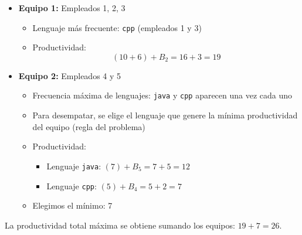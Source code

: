 \begin{itemize}
    \item \textbf{Equipo 1:} Empleados 1, 2, 3  
        \begin{itemize}
            \item Lenguaje más frecuente: \texttt{cpp} (empleados 1 y 3)  
            \item Productividad: 
            \[
            (10 + 6) + B_2 = 16 + 3 = 19
            \]
        \end{itemize}
    \item \textbf{Equipo 2:} Empleados 4 y 5  
        \begin{itemize}
            \item Frecuencia máxima de lenguajes: \texttt{java} y \texttt{cpp} aparecen una vez cada uno  
            \item Para desempatar, se elige el lenguaje que genere la mínima productividad del equipo (regla del problema)  
            \item Productividad:  
            \begin{itemize}
                \item Lenguaje \texttt{java}: $(7) + B_5 = 7 + 5 = 12$  
                \item Lenguaje \texttt{cpp}: $(5) + B_4 = 5 + 2 = 7$  
            \end{itemize}
            \item Elegimos el mínimo: 7
        \end{itemize}
\end{itemize}

La productividad total máxima se obtiene sumando los equipos: $19 + 7 = 26$.